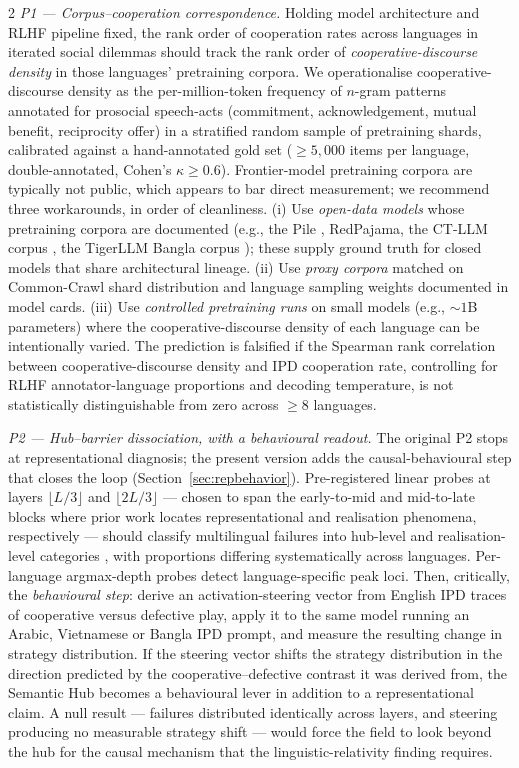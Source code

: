 \documentclass[openacc]{rsproca_new}
\begin{document}
\begin{multicols}{2}
\emph{P1 --- Corpus--cooperation correspondence.} Holding model architecture and RLHF pipeline fixed, the rank order of cooperation rates across languages in iterated social dilemmas should track the rank order of \emph{cooperative-discourse density} in those languages' pretraining corpora. We operationalise cooperative-discourse density as the per-million-token frequency of $n$-gram patterns annotated for prosocial speech-acts (commitment, acknowledgement, mutual benefit, reciprocity offer) in a stratified random sample of pretraining shards, calibrated against a hand-annotated gold set ($\geq 5{,}000$ items per language, double-annotated, Cohen's $\kappa \geq 0.6$). Frontier-model pretraining corpora are typically not public, which appears to bar direct measurement; we recommend three workarounds, in order of cleanliness. (i) Use \emph{open-data models} whose pretraining corpora are documented (e.g., the Pile \cite{gao2020pile}, RedPajama, the CT-LLM corpus \cite{du2024ctllm}, the TigerLLM Bangla corpus \cite{raihan2025tigerllm}); these supply ground truth for closed models that share architectural lineage. (ii) Use \emph{proxy corpora} matched on Common-Crawl shard distribution and language sampling weights documented in model cards. (iii) Use \emph{controlled pretraining runs} on small models (e.g., $\sim 1$B parameters) where the cooperative-discourse density of each language can be intentionally varied. The prediction is falsified if the Spearman rank correlation between cooperative-discourse density and IPD cooperation rate, controlling for RLHF annotator-language proportions and decoding temperature, is not statistically distinguishable from zero across $\geq 8$ languages.

\emph{P2 --- Hub--barrier dissociation, with a behavioural readout.} The original P2 stops at representational diagnosis; the present version adds the causal-behavioural step that closes the loop (Section~\ref{sec:repbehavior}). Pre-registered linear probes at layers $\lfloor L/3 \rfloor$ and $\lfloor 2L/3 \rfloor$ --- chosen to span the early-to-mid and mid-to-late blocks where prior work locates representational and realisation phenomena, respectively \cite{wendler2024llamasenglish, bafna2025translationbarrier, zhenyu2025logitlens} --- should classify multilingual failures into hub-level and realisation-level categories \cite{kumar2025indictunedlens}, with proportions differing systematically across languages. Per-language argmax-depth probes detect language-specific peak loci. Then, critically, the \emph{behavioural step}: derive an activation-steering vector \cite{turner2023actadd} from English IPD traces of cooperative versus defective play, apply it to the same model running an Arabic, Vietnamese or Bangla IPD prompt, and measure the resulting change in strategy distribution. If the steering vector shifts the strategy distribution in the direction predicted by the cooperative--defective contrast it was derived from, the Semantic Hub becomes a behavioural lever in addition to a representational claim. A null result --- failures distributed identically across layers, and steering producing no measurable strategy shift --- would force the field to look beyond the hub for the causal mechanism that the linguistic-relativity finding requires.


\end{multicols}
\end{document}
